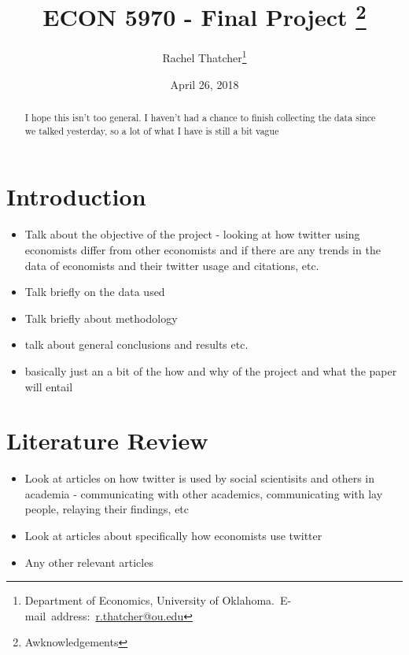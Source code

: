 \documentclass[12pt,english]{article}
\begin{document}
\begin{singlespace}
\title{ECON 5970 - Final Project \thanks{Awknowledgements}}
\end{singlespace}

\author{Rachel Thatcher\thanks{Department of Economics, University of Oklahoma.\
E-mail~address:~\href{mailto:r.thatcher@ou.edu}{r.thatcher@ou.edu}}}

\date{April 26, 2018}

\maketitle

\begin{abstract}
\begin{singlespace}
I hope this isn't too general. I haven't had a chance to finish collecting the data since we talked yesterday, so a lot of what I have is still a bit vague

\end{singlespace}

\end{abstract}
\vfill{}


\pagebreak{}


\section{Introduction}\label{sec:intro}

\begin{itemize}
  \item Talk about the objective of the project - looking at how twitter using economists differ from other economists and if there are any trends in the data of economists and their twitter usage and citations, etc.
  \item Talk briefly on the data used
  \item Talk briefly about methodology
  \item talk about general conclusions and results etc.
  \item basically just an a bit of the how and why of the project and what the paper will entail
\end{itemize}

\section{Literature Review}\label{sec:litreview}

\begin{itemize}
    \item Look at articles on how twitter is used by social scientisits and others in academia - communicating with other academics, communicating with lay people, relaying their findings, etc
    \item Look at articles about specifically how economists use twitter
    \item Any other relevant articles
\end{itemize}
\end{document}
